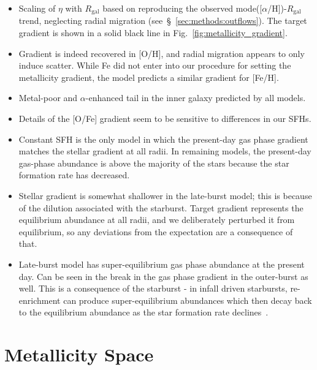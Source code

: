 \documentclass[a4paper, fleqn, usenatbib, useAMS]{mnras}
\begin{document}
\begin{itemize} 
	\item Scaling of $\eta$ with $R_\text{gal}$ based on reproducing the 
	observed mode([$\alpha$/H])-$R_\text{gal}$ trend, neglecting radial 
	migration (see~\S~\ref{sec:methods:outflows}). The target gradient is 
	shown in a solid black line in Fig.~\ref{fig:metallicity_gradient}. 

	\item Gradient is indeed recovered in [O/H], and radial migration appears 
	to only induce scatter. While Fe did not enter into our procedure for 
	setting the metallicity gradient, the model predicts a similar gradient 
	for [Fe/H]. 

	\item Metal-poor and $\alpha$-enhanced tail in the inner galaxy predicted 
	by all models. 

	\item Details of the [O/Fe] gradient seem to be sensitive to differences 
	in our SFHs. 

	\item Constant SFH is the only model in which the present-day gas phase 
	gradient matches the stellar gradient at all radii. In remaining models, 
	the present-day gas-phase abundance is above the majority of the stars 
	because the star formation rate has decreased. 

	\item Stellar gradient is somewhat shallower in the late-burst model; this 
	is because of the dilution associated with the starburst. Target gradient 
	represents the equilibrium abundance at all radii, and we deliberately 
	perturbed it from equilibrium, so any deviations from the expectation are 
	a consequence of that. 

	\item Late-burst model has super-equilibrium gas phase abundance at the 
	present day. Can be seen in the break in the gas phase gradient in the 
	outer-burst as well. This is a consequence of the starburst - in infall 
	driven starbursts, re-enrichment can produce super-equilibrium abundances 
	which then decay back to the equilibrium abundance as the star 
	formation rate declines~\citep{Johnson2020}. 
\end{itemize} 

\section{Metallicity Space} 
\label{sec:metallicity_space} 
\end{document}
